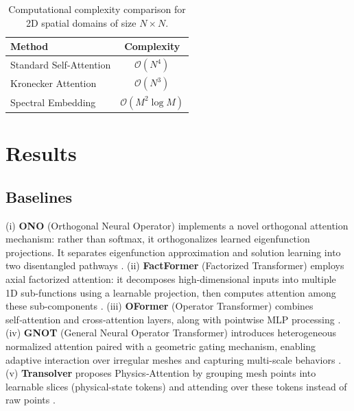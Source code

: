 \documentclass[final,3p,times]{elsarticle}
\begin{document}
\begin{table}[h]
\centering
\caption{Computational complexity comparison for 2D spatial domains of size $N \times N$.}
\label{tab:complexity_comparison}
\begin{tabular}{l c}
\toprule
\textbf{Method} & \textbf{Complexity} \\
\midrule
Standard Self-Attention & $\mathcal{O}(N^4)$ \\
Kronecker Attention & $\mathcal{O}(N^3)$ \\
Spectral Embedding & $\mathcal{O}(M^2 \log M)$ \\
\bottomrule
\end{tabular}
\end{table}



\section{Results}
\subsection{Baselines}
(i) \textbf{ONO} (Orthogonal Neural Operator) implements a novel orthogonal attention mechanism: rather than softmax, it orthogonalizes learned eigenfunction projections. It separates eigenfunction approximation and solution learning into two disentangled pathways \cite{xiao2023improved}.
(ii) \textbf{FactFormer} (Factorized Transformer) employs axial factorized attention: it decomposes high-dimensional inputs into multiple 1D sub-functions using a learnable projection, then computes attention among these sub-components \cite{li2023scalable}.
(iii) \textbf{OFormer} (Operator Transformer) combines self‑attention and cross‑attention layers, along with pointwise MLP processing \cite{li2022transformer}.
(iv) \textbf{GNOT} (General Neural Operator Transformer) introduces heterogeneous normalized attention paired with a geometric gating mechanism, enabling adaptive interaction over irregular meshes and capturing multi-scale behaviors \cite{hao2023gnot}.
(v) \textbf{Transolver} proposes Physics‑Attention by grouping mesh points into learnable slices (physical-state tokens) and attending over these tokens instead of raw points \cite{wu2024transolver}.
\end{document}
